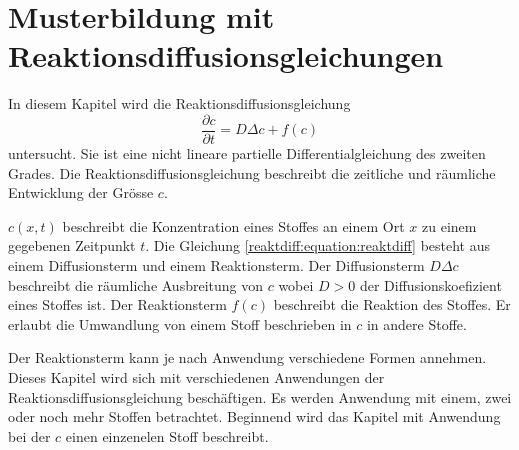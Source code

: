%
%
%
%
\chapter{Musterbildung mit Reaktionsdiffusionsgleichungen\label{chapter:reaktdiff}}
\begin{refsection}

In diesem Kapitel wird die Reaktionsdiffusionsgleichung
\begin{equation}
\label{reaktdiff:equation:reaktdiff}
\frac{\partial c}{\partial t} = D \Delta c + f(c)
\end{equation}
untersucht.
Sie ist eine nicht lineare partielle Differentialgleichung des zweiten Grades.
Die Reaktionsdiffusionsgleichung beschreibt die zeitliche und räumliche Entwicklung der Grösse \(c\).

\(c(x,t)\) beschreibt die Konzentration eines Stoffes an einem Ort \(x\) zu einem gegebenen Zeitpunkt \(t\).
Die Gleichung \eqref{reaktdiff:equation:reaktdiff} besteht aus einem Diffusionsterm und einem Reaktionsterm.
Der Diffusionsterm \(D \Delta c\) beschreibt die räumliche Ausbreitung von \(c\) wobei \(D > 0\) der Diffusionskoefizient eines Stoffes ist.
Der Reaktionsterm \(f(c)\) beschreibt die Reaktion des Stoffes.
Er erlaubt die Umwandlung von einem Stoff beschrieben in \(c\) in andere Stoffe.

Der Reaktionsterm kann je nach Anwendung verschiedene Formen annehmen.
Dieses Kapitel wird sich mit verschiedenen Anwendungen der Reaktionsdiffusionsgleichung beschäftigen.
Es werden Anwendung mit einem, zwei oder noch mehr Stoffen betrachtet.
Beginnend wird das Kapitel mit Anwendung bei der \(c\) einen einzenelen Stoff beschreibt.







\printbibliography[heading=subbibliography]
\end{refsection}
